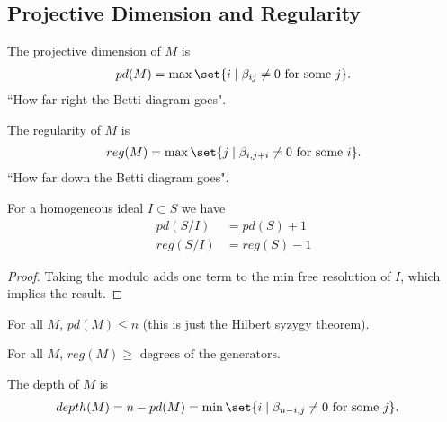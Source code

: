 \subsection{Projective Dimension and Regularity}

\begin{definition}
    The projective dimension of $M$ is
    \begin{align*}
        pd(M) = \max \set{ i \mid \beta_{ij} \neq 0 \text{ for some } j}.
    \end{align*}
    ``How far right the Betti diagram goes".
\end{definition}

\begin{definition}
    The regularity of $M$ is
    \begin{align*}
        reg(M) = \max \set{ j \mid \beta_{i,j+i} \neq 0 \text{ for some } i}.
    \end{align*}
    ``How far down the Betti diagram goes".
\end{definition}

\begin{proposition}
    For a homogeneous ideal $I \subset S$  we have
    \begin{align*}
        pd(S/I ) &= pd(S) + 1\\
        reg(S / I ) &= reg(S) -1
    \end{align*}
\end{proposition}

\begin{proof}
    Taking the modulo adds one term to the min free resolution of $I$, which implies the result.
\end{proof}

\begin{lemma}
    For all $M$, $pd(M) \leq n$ (this is just the Hilbert syzygy theorem).
\end{lemma}

\begin{lemma}
    For all $M$, $reg(M) \geq \text{ degrees of the generators}$.
\end{lemma}

\begin{definition}
    The depth of $M$ is
    \begin{align*}
        depth(M) &= n - pd(M) = \min \set{i \mid \beta_{n-i, j} \neq 0 \text{ for some } j}.
    \end{align*}
\end{definition}

